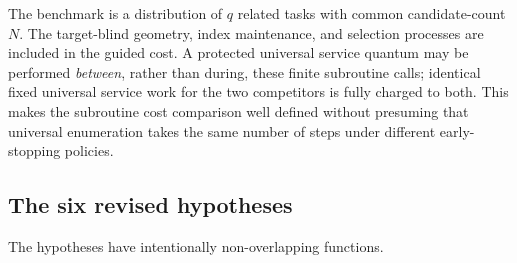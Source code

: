 \documentclass[11pt,letterpaper]{article}
\theoremstyle{definition}
\theoremstyle{remark}
\begin{document}
The benchmark is a distribution of $q$ related tasks with common candidate-count $N$. The target-blind geometry, index maintenance, and selection processes are included in the guided cost. A protected universal service quantum may be performed \emph{between}, rather than during, these finite subroutine calls; identical fixed universal service work for the two competitors is fully charged to both. This makes the subroutine cost comparison well defined without presuming that universal enumeration takes the same number of steps under different early-stopping policies.

\subsection{The six revised hypotheses}
The hypotheses have intentionally non-overlapping functions.
\end{document}
